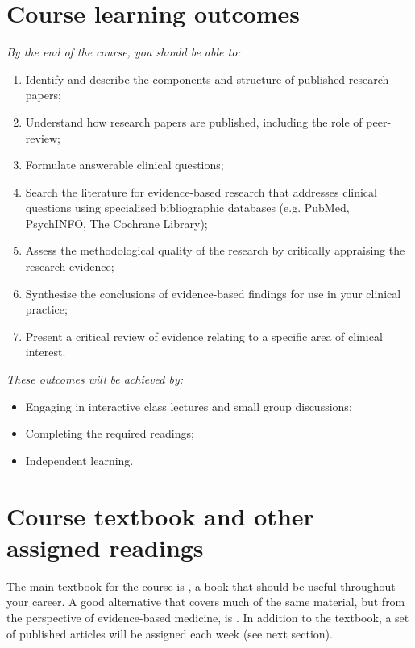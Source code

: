 \documentclass[a4paper, 11pt]{article}
\begin{document}
\section*{Course learning outcomes}
\begin{description}
\item{\emph{By the end of the course, you should be able to:}}
	\begin{enumerate}
	\item Identify and describe the components and structure of published research papers;
	\item Understand how research papers are published, including the role of peer-review;
	\item Formulate answerable clinical questions;
	\item Search the literature for evidence-based research that addresses clinical questions using specialised bibliographic databases (e.g. PubMed, PsychINFO, The Cochrane Library);
	\item Assess the methodological quality of the research by critically appraising the research evidence;
	\item Synthesise the conclusions of evidence-based findings for use in your clinical practice;
	\item Present a critical review of evidence relating to a specific area of clinical interest.
	\end{enumerate} 

\item{\emph{These outcomes will be achieved by:}}
	\begin{itemize}
	\item Engaging in interactive class lectures and small group discussions; 
	\item Completing the required readings; 
	\item Independent learning.
	\end{itemize}
\end{description}

\section*{Course textbook and other assigned readings}
The main textbook for the course is \cite{Dollaghan2007a}, a book that should be useful throughout your career. A good alternative that covers much of the same material, but from the perspective of evidence-based medicine, is \cite{Greenhalgh2010}. In addition to the textbook, a set of published articles will be assigned each week (see next section).
\end{document}
